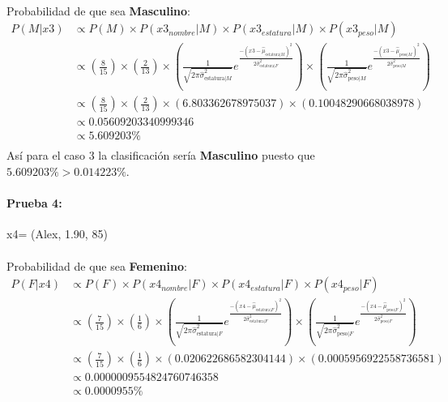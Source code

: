 \documentclass[12pt]{article}
\begin{document}
\paragraph{}Probabilidad de que sea \textbf{Masculino}:\\
\begin{equation}
\begin{split}
P(M|x3) &\propto P(M) \times P(x3_{nombre}|M) \times P(x3_{estatura}|M) \times P(x3_{peso}|M) \\
&\propto (\frac{8}{15}) \times (\frac{2}{13}) \times (\frac{1}{\sqrt{2\pi\hat{\sigma}_{\text{estatura}|M}^2}}e^{\frac{-(x3 - \hat{\mu}_{\text{estatura}|M})^2}{2\hat{\sigma}_{\text{estatura}|F}^2}}) \times (\frac{1}{\sqrt{2\pi\hat{\sigma}_{\text{peso}|M}^2}}e^{\frac{-(x3 - \hat{\mu}_{\text{peso}|M})^2}{2\hat{\sigma}_{\text{peso}|M}^2}}) \\
&\propto (\frac{8}{15}) \times (\frac{2}{13}) \times (6.803362678975037) \times (0.10048290668038978) \\
&\propto 0.05609203340999346 \\
&\propto 5.609203 \% \\
\end{split}
\end{equation}
Así para el caso 3 la clasificación sería \textbf{Masculino} puesto que $5.609203\% > 0.014223\%$.\\
\clearpage
\pagebreak
\paragraph{Prueba 4: }x4= (Alex, 1.90, 85)
\paragraph{}Probabilidad de que sea \textbf{Femenino}:\\
\begin{equation}
\begin{split}
P(F|x4) &\propto P(F) \times P(x4_{nombre}|F) \times P(x4_{estatura}|F) \times P(x4_{peso}|F) \\
&\propto (\frac{7}{15}) \times (\frac{1}{6}) \times (\frac{1}{\sqrt{2\pi\hat{\sigma}_{\text{estatura}|F}^2}}e^{\frac{-(x4 - \hat{\mu}_{\text{estatura}|F})^2}{2\hat{\sigma}_{\text{estatura}|F}^2}}) \times (\frac{1}{\sqrt{2\pi\hat{\sigma}_{\text{peso}|F}^2}}e^{\frac{-(x4 - \hat{\mu}_{\text{peso}|F})^2}{2\hat{\sigma}_{\text{peso}|F}^2}}) \\
&\propto (\frac{7}{15}) \times (\frac{1}{6}) \times (0.020622686582304144) \times (0.0005956922558736581) \\
&\propto 0.0000009554824760746358 \\
&\propto 0.0000955\% \\
\end{split}
\end{equation}
\end{document}

